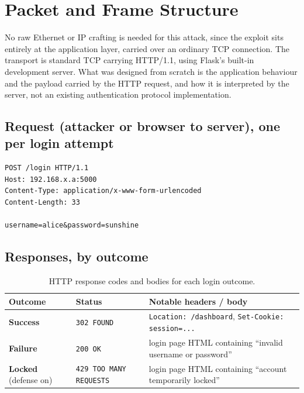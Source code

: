 \documentclass[11pt]{article}
\begin{document}
\section{Packet and Frame Structure}
\label{sec:packet}

No raw Ethernet or IP crafting is needed for this attack, since the exploit
sits entirely at the application layer, carried over an ordinary TCP
connection. The transport is standard TCP carrying HTTP/1.1, using Flask's
built-in development server. What was designed from scratch is the
application behaviour and the payload carried by the HTTP request, and how
it is interpreted by the server, not an existing authentication protocol
implementation.

\subsection{Request (attacker or browser to server), one per login attempt}

\begin{lstlisting}
POST /login HTTP/1.1
Host: 192.168.x.a:5000
Content-Type: application/x-www-form-urlencoded
Content-Length: 33

username=alice&password=sunshine
\end{lstlisting}

\subsection{Responses, by outcome}

\begin{table}[H]
\centering
\begin{tabularx}{\textwidth}{@{} l l X @{}}
\toprule
\rowcolor{navy!12}
\textbf{Outcome} & \textbf{Status} & \textbf{Notable headers / body} \\
\midrule
\textcolor{oklive}{\textbf{Success}} & \texttt{302 FOUND} & \texttt{Location: /dashboard}, \texttt{Set-Cookie: session=...} \\
\textcolor{warnamber!90!black}{\textbf{Failure}} & \texttt{200 OK} & login page HTML containing ``invalid username or password'' \\
\textcolor{lockred}{\textbf{Locked}} (defense on) & \texttt{429 TOO MANY REQUESTS} & login page HTML containing ``account temporarily locked'' \\
\bottomrule
\end{tabularx}
\caption{HTTP response codes and bodies for each login outcome.}
\end{table}
\end{document}

